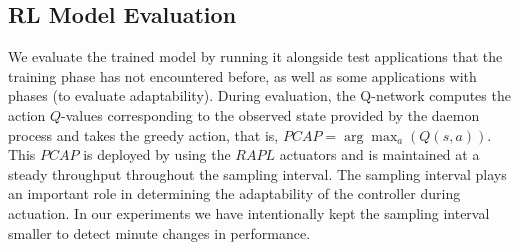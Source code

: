 
\subsection{RL Model Evaluation}\label{sec:model_eval}
We evaluate the trained model by running it alongside test applications that the training phase has not encountered before, as well as some applications with phases (to evaluate adaptability). During evaluation, the Q-network computes the action $Q$-values corresponding to the observed state provided by the daemon process and takes the greedy action, that is, $PCAP = \arg\max_a(Q(s, a))$. This $PCAP$ is deployed by using the $RAPL$ actuators and is maintained at a steady throughput throughout the sampling interval. The sampling interval plays an important role in determining the adaptability of the controller during actuation. In our experiments we have intentionally kept the sampling interval smaller to detect minute changes in performance.




